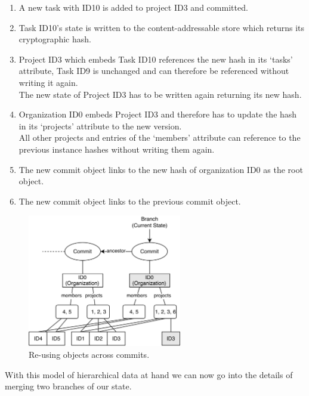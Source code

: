 \begin{enumerate}
\item A new task with ID10 is added to project ID3 and committed.
\item Task ID10's state is written to the content-addressable store which returns its cryptographic hash.
\item Project ID3 which embeds Task ID10 references the new hash in its `tasks' attribute, Task ID9 is unchanged and can therefore be referenced without writing it again.\\
The new state of Project ID3 has to be written again returning its new hash.
\item Organization ID0 embeds Project ID3 and therefore has to update the hash in its `projects' attribute to the new version.\\
All other projects and entries of the `members' attribute can reference to the previous instance hashes without writing them again.
\item The new commit object links to the new hash of organization ID0 as the root object.
\item The new commit object links to the previous commit object.
\end{enumerate}

\begin{figure}[commits]
  \centering
  \includegraphics[width=0.6\textwidth]{img/commits}
  \caption{Re-using objects across commits.}
  \label{fig:histo.commits}
\end{figure}

With this model of hierarchical data at hand we can now go into the details of merging two branches of our state.
